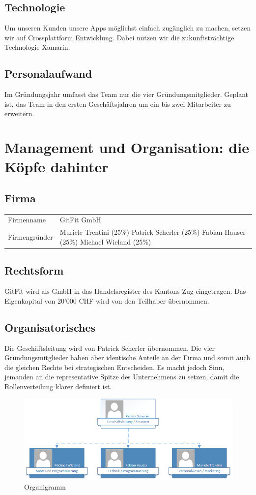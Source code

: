 \subsection{Technologie}
Um unseren Kunden unsere Apps möglichst einfach zugänglich zu machen, setzen wir auf Crossplattform Entwicklung. Dabei nutzen wir die zukunftsträchtige Technologie Xamarin.
\subsection{Personalaufwand}
Im Gründungsjahr umfasst das Team nur die vier Gründungsmitglieder. Geplant ist, das Team in den ersten Geschäftsjahren um ein bis zwei Mitarbeiter zu erweitern.

\clearpage
\section{Management und Organisation: die Köpfe dahinter}

\subsection{Firma}
\begin{tabu} to \linewidth {l X}
	Firmenname & GitFit GmbH \\
	Firmengründer & Muriele Trentini (25\%)  \newline Patrick Scherler (25\%) \newline Fabian Hauser (25\%) \newline Michael Wieland (25\%) \\
\end{tabu} 

\subsection{Rechtsform}
GitFit wird als GmbH in das Handelsregister des Kantons Zug eingetragen. Das Eigenkapital von 20'000 CHF wird von den Teilhaber übernommen.


\subsection{Organisatorisches}
Die Geschäftsleitung wird von Patrick Scherler übernommen. Die vier Gründungsmitglieder haben aber identische Anteile an der Firma und somit auch die gleichen Rechte bei strategischen Entscheiden. Es macht jedoch Sinn, jemanden an die representative Spitze des Unternehmens zu setzen, damit die Rollenverteilung klarer definiert ist.
\begin{figure}[h]
	\centering
	\includegraphics[width=0.9\linewidth]{images/organigramm}
	\caption{Organigramm}
	\label{fig:organigramm}
\end{figure}


